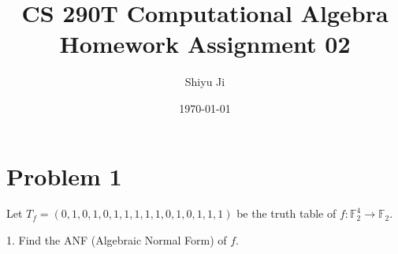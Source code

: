 \documentclass[12pt]{article}
\theoremstyle{plain}
\begin{document}
\title{CS 290T Computational Algebra Homework Assignment 02}
\author{Shiyu Ji}
\date{\today}
\maketitle

\newcommand{\m}[1]{\begin{pmatrix}#1\end{pmatrix}}
\newcommand{\rank}[1]{\operatorname{rank}(#1)}
\newcommand{\F}{\mathbb{F}}

\section{Problem 1}
Let $T_f =  (0, 1, 0, 1, 0, 1, 1, 1, 1, 1, 0, 1, 0, 1, 1, 1)$ be the truth table of $f : \F_2^4 \to \F_2$.

1. Find the ANF (Algebraic Normal Form) of $f$.
\end{document}
